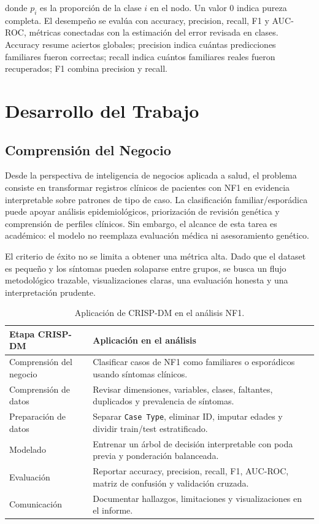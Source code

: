 \documentclass[10pt,a4paper]{article}
\begin{document}
donde $p_i$ es la proporción de la clase $i$ en el nodo. Un valor 0 indica pureza completa. El desempeño se evalúa con accuracy, precision, recall, F1 y AUC-ROC, métricas conectadas con la estimación del error revisada en clases. Accuracy resume aciertos globales; precision indica cuántas predicciones familiares fueron correctas; recall indica cuántos familiares reales fueron recuperados; F1 combina precision y recall.

\section{Desarrollo del Trabajo}

\subsection{Comprensión del Negocio}

Desde la perspectiva de inteligencia de negocios aplicada a salud, el problema consiste en transformar registros clínicos de pacientes con NF1 en evidencia interpretable sobre patrones de tipo de caso. La clasificación familiar/esporádica puede apoyar análisis epidemiológicos, priorización de revisión genética y comprensión de perfiles clínicos. Sin embargo, el alcance de esta tarea es académico: el modelo no reemplaza evaluación médica ni asesoramiento genético.

El criterio de éxito no se limita a obtener una métrica alta. Dado que el dataset es pequeño y los síntomas pueden solaparse entre grupos, se busca un flujo metodológico trazable, visualizaciones claras, una evaluación honesta y una interpretación prudente.

\begin{table}[H]
\centering
\small
\begin{tabularx}{\textwidth}{p{3.2cm}X}
\toprule
Etapa CRISP-DM & Aplicación en el análisis \\
\midrule
Comprensión del negocio & Clasificar casos de NF1 como familiares o esporádicos usando síntomas clínicos. \\
Comprensión de datos & Revisar dimensiones, variables, clases, faltantes, duplicados y prevalencia de síntomas. \\
Preparación de datos & Separar \texttt{Case Type}, eliminar ID, imputar edades y dividir train/test estratificado. \\
Modelado & Entrenar un árbol de decisión interpretable con poda previa y ponderación balanceada. \\
Evaluación & Reportar accuracy, precision, recall, F1, AUC-ROC, matriz de confusión y validación cruzada. \\
Comunicación & Documentar hallazgos, limitaciones y visualizaciones en el informe. \\
\bottomrule
\end{tabularx}
\caption{Aplicación de CRISP-DM en el análisis NF1.}
\label{tab:crispdm}
\end{table}
\end{document}
